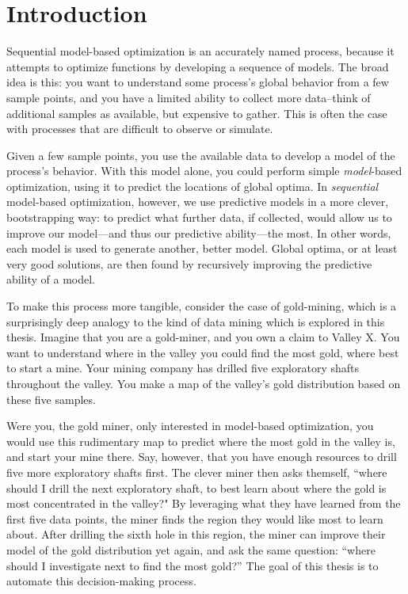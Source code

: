 \chapter*{Introduction}

Sequential model-based optimization is an accurately named process, because it attempts to optimize functions by developing a sequence of models. The broad idea is this: you want to understand some process's global behavior from a few sample points, and you have a limited ability to collect more data--think of additional samples as available, but expensive to gather. This is often the case with processes that are difficult to observe or simulate.

Given a few sample points, you use the available data to develop a model of the process's behavior.  With this model alone, you could perform simple \emph{model}-based optimization, using it to predict the locations of global optima. In \emph{sequential} model-based optimization, however, we use predictive models in a more clever, bootstrapping way: to predict what further data, if collected, would allow us to improve our model---and thus our predictive ability---the most. In other words, each model is used to generate another, better model. Global optima, or at least very good solutions, are then found by recursively improving the predictive ability of a model.

To make this process more tangible, consider the case of gold-mining, which is a surprisingly deep analogy to the kind of data mining which is explored in this thesis. Imagine that you are a gold-miner, and you own a claim to Valley X. You want to understand where in the valley you could find the most gold, where best to start a mine. Your mining company has drilled five exploratory shafts throughout the valley. You make a map of the valley's gold distribution based on these five samples.

Were you, the gold miner, only interested in model-based optimization, you would use this rudimentary map to predict where the most gold in the valley is, and start your mine there. Say, however, that you have enough resources to drill five more exploratory shafts first. The clever miner then asks themself, ``where should I drill the next exploratory shaft, to best learn about where the gold is most concentrated in the valley?" By leveraging what they have learned from the first five data points, the miner finds the region they would like most to learn about. After drilling the sixth hole in this region, the miner can improve their model of the gold distribution yet again, and ask the same question: ``where should I investigate next to find the most gold?'' The goal of this thesis is to automate this decision-making process.

